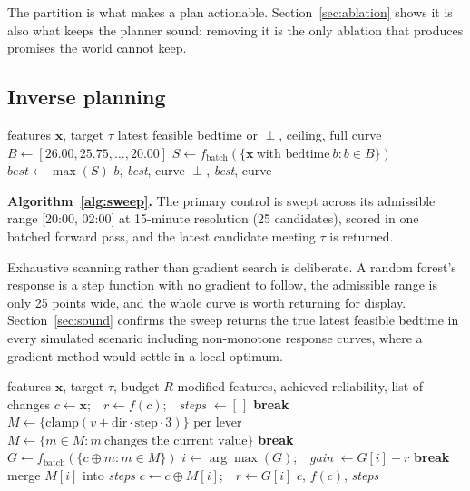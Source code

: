 \documentclass[conference]{IEEEtran}
\begin{document}
The partition is what makes a plan actionable. Section~\ref{sec:ablation} shows
it is also what keeps the planner sound: removing it is the only ablation that
produces promises the world cannot keep.

\subsection{Inverse planning}

\begin{algorithm}[t]
\caption{Bedtime sweep}
\label{alg:sweep}
\begin{algorithmic}[1]
\Require features $\mathbf{x}$, target $\tau$
\Ensure latest feasible bedtime or $\perp$, ceiling, full curve
\State $B \gets [26.00, 25.75, \dots, 20.00]$ 
\State $S \gets f_{\text{batch}}(\{\mathbf{x}\ \text{with bedtime}\ b : b \in B\})$
\State $\textit{best} \gets \max(S)$
   \Return $b$, \textit{best}, curve 
  \EndIf
\EndFor
\State \Return $\perp$, \textit{best}, curve
\end{algorithmic}
\end{algorithm}

\textbf{Algorithm~\ref{alg:sweep}.} The primary control is swept across its
admissible range [20:00, 02:00] at 15-minute resolution (25 candidates), scored
in one batched forward pass, and the latest candidate meeting $\tau$ is
returned.

Exhaustive scanning rather than gradient search is deliberate. A random forest's
response is a step function with no gradient to follow, the admissible range is
only 25 points wide, and the whole curve is worth returning for display.
Section~\ref{sec:sound} confirms the sweep returns the true latest feasible
bedtime in every simulated scenario including non-monotone response curves,
where a gradient method would settle in a local optimum.

\begin{algorithm}[t]
\caption{Greedy coordinate ascent}
\label{alg:ascent}
\begin{algorithmic}[1]
\Require features $\mathbf{x}$, target $\tau$, budget $R$
\Ensure modified features, achieved reliability, list of changes
\State $c \gets \mathbf{x}$;\ \ $r \gets f(c)$;\ \ \textit{steps} $\gets [\,]$
   \textbf{break} \EndIf
  \State $M \gets \{\text{clamp}(v + \text{dir}\cdot\text{step}\cdot 3)\}$ per lever
  \State $M \gets \{m \in M : m\ \text{changes the current value}\}$
   \textbf{break} \EndIf
  \State $G \gets f_{\text{batch}}(\{c \oplus m : m \in M\})$
  \State $i \gets \arg\max(G)$;\ \ \textit{gain} $\gets G[i] - r$
   \textbf{break} \EndIf
  \State merge $M[i]$ into \textit{steps} 
  \State $c \gets c \oplus M[i]$;\ \ $r \gets G[i]$
\EndFor
\State \Return $c$, $f(c)$, \textit{steps}
\end{algorithmic}
\end{algorithm}
\end{document}
